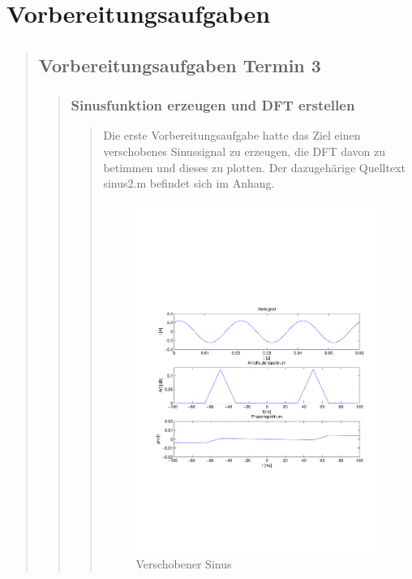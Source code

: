 \section{Vorbereitungsaufgaben}
\begin{quote}
    \subsection{Vorbereitungsaufgaben Termin 3}
    \begin{quote}
        \subsubsection{Sinusfunktion erzeugen und DFT erstellen}
        \begin{quote}
            Die erste Vorbereitungsaufgabe hatte das Ziel einen verschobenes Sinussignal zu erzeugen, die DFT davon zu
            betimmen und dieses zu plotten. Der dazugehärige Quelltext sinus2.m befindet sich im Anhang.
            \begin{figure}[H]
            \centering
                \includegraphics[scale=0.5, trim = 0cm 0cm 0cm 0cm, clip]{./Bilder/VerschobenerSinusAufgabe1}
                    \caption{Verschobener Sinus}
                    \label{fig:./Bilder/VerschobenerSinusAufgabe1}
            \end{figure}
        

\end{quote}
\end{quote}
\end{quote}
